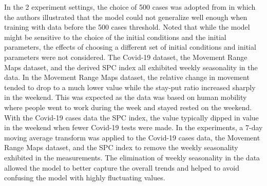 In the 2 experiment settings, the choice of 500 cases was adopted from \cite{dandekarMachineLearningAidedGlobal2020a} in which the authors illustrated that the model could not generalize well enough when training with data before the 500 cases threshold.
Noted that while the model might be sensitive to the choice of the initial conditions and the initial parameters, the effects of choosing a different set of initial conditions and initial parameters were not considered.
The Covid-19 dataset, the Movement Range Maps dataset, and the derived \gls{SPC} index all exhibited weekly seasonality in the data.
In the Movement Range Maps dataset, the relative change in movement tended to drop to a much lower value while the stay-put ratio increased sharply in the weekend.
This was expected as the data was based on human mobility where people went to work during the week and stayed rested on the weekend.
With the Covid-19 cases data the \gls{SPC} index, the value typically dipped in value in the weekend when fewer Covid-19 tests were made.
In the experiments, a 7-day moving average transform was applied to the Covid-19 cases data, the Movement Range Maps dataset, and the \gls{SPC} index to remove the weekly seasonality exhibited in the measurements.
The elimination of weekly seasonality in the data allowed the model to better capture the overall trends and helped to avoid confusing the model with highly fluctuating values.